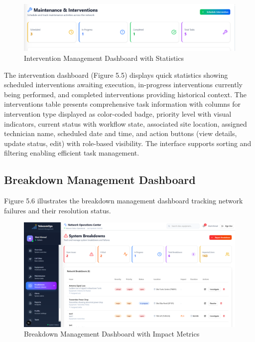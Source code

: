 \begin{figure}[H]
    \centering
    \includegraphics[width=0.9\linewidth]{img/chap_05/screenshot_interventions_dashboard.png}
    \caption{Intervention Management Dashboard with Statistics}
    \label{fig:interventions_dashboard}
\end{figure}

The intervention dashboard (Figure 5.5) displays quick statistics showing scheduled interventions awaiting execution, in-progress interventions currently being performed, and completed interventions providing historical context. The interventions table presents comprehensive task information with columns for intervention type displayed as color-coded badge, priority level with visual indicators, current status with workflow state, associated site location, assigned technician name, scheduled date and time, and action buttons (view details, update status, edit) with role-based visibility. The interface supports sorting and filtering enabling efficient task management.

\subsection{Breakdown Management Dashboard}

Figure 5.6 illustrates the breakdown management dashboard tracking network failures and their resolution status.

\begin{figure}[H]
    \centering
    \includegraphics[width=0.9\linewidth]{img/chap_05/screenshot_breakdowns_dashboard.png}
    \caption{Breakdown Management Dashboard with Impact Metrics}
    \label{fig:breakdowns_dashboard}
\end{figure}

